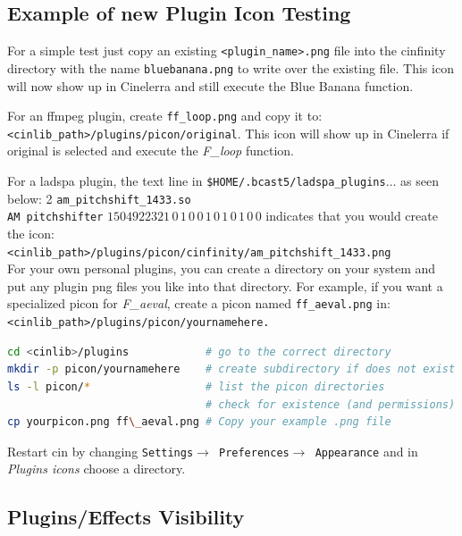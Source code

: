 \subsection{Example of new Plugin Icon Testing}%
\label{sub:example_plugin_icon_testing}

For a simple test just copy an existing \texttt{<plugin\_name>.png} file into the cinfinity directory with the name \texttt{bluebanana.png} to write over the existing file. This icon will now show up in Cinelerra and still execute the Blue Banana function.

For an ffmpeg plugin, create \texttt{ff\_loop.png} and copy it to: \\
\texttt{<cinlib\_path>/plugins/picon/original}. This icon will show up in Cinelerra if original is selected and execute the \textit{F\_loop} function.

For a ladspa plugin, the text line in \texttt{\$HOME/.bcast5/ladspa\_plugins}$\dots$ as seen below:
2 \texttt{am\_pitchshift\_1433.so} \\
\texttt{AM pitchshifter} $1504922321\, 0\, 1\, 0\, 0\, 1\, 0\, 1\, 0\, 1\, 0\, 0$ indicates that you would create the icon: \\ \texttt{<cinlib\_path>/plugins/picon/cinfinity/am\_pitchshift\_1433.png} \\
For your own personal plugins, you can create a directory on your system and put any plugin png files you like into that directory. For example, if you want a specialized picon for \textit{F\_aeval}, create a picon named \texttt{ff\_aeval.png} in: \\ \texttt{<cinlib\_path>/plugins/picon/yournamehere.}

\begin{lstlisting}[language=Bash,numbers=none]
cd <cinlib>/plugins            # go to the correct directory
mkdir -p picon/yournamehere    # create subdirectory if does not exist
ls -l picon/*                  # list the picon directories
                               # check for existence (and permissions)
cp yourpicon.png ff\_aeval.png # Copy your example .png file
\end{lstlisting}

Restart cin by changing \texttt{Settings$\rightarrow$ Preferences$\rightarrow$ Appearance} and in \textit{Plugins icons} choose a directory.

\subsection{Plugins/Effects Visibility}%
\label{sub:plugins_effects_visibility}

